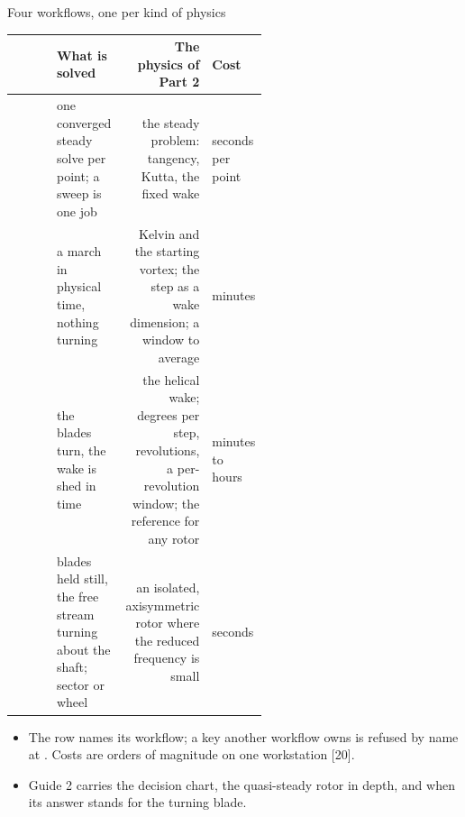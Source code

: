 \begin{frame}{Four workflows, one per kind of physics}
\relax
{\ftstablesize\renewcommand{\arraystretch}{1.10}
\begin{tabularx}{\linewidth}{@{}P{0.17\linewidth}P{0.27\linewidth}RP{0.12\linewidth}@{}}
\toprule
\textbf{} & \textbf{What is solved} & \textbf{The physics of Part 2} & \textbf{Cost} \\
\midrule
{} & one converged steady solve per point; a sweep is one job &
  the steady problem: tangency, Kutta, the fixed wake & seconds per point \\
 & a march in physical time, nothing turning & Kelvin and
  the starting vortex; the step as a wake dimension; a window to average &
  minutes \\
 & the blades turn, the wake is shed in time & the
  helical wake; degrees per step, revolutions, a per-revolution window; the
  reference for any rotor & minutes to hours \\
 & blades held still, the free stream turning about the
  shaft; sector or wheel & an isolated, axisymmetric rotor where the reduced
  frequency is small & seconds \\
\bottomrule
\end{tabularx}}
\vspace{1mm}
\begin{itemize}\small
  \item The row names its workflow; a key another workflow owns is refused by
        name at . Costs are orders of magnitude on one
        workstation [20].
  \item Guide 2 carries the decision chart, the quasi-steady rotor in depth,
        and when its answer stands for the turning blade.
\end{itemize}
\end{frame}

